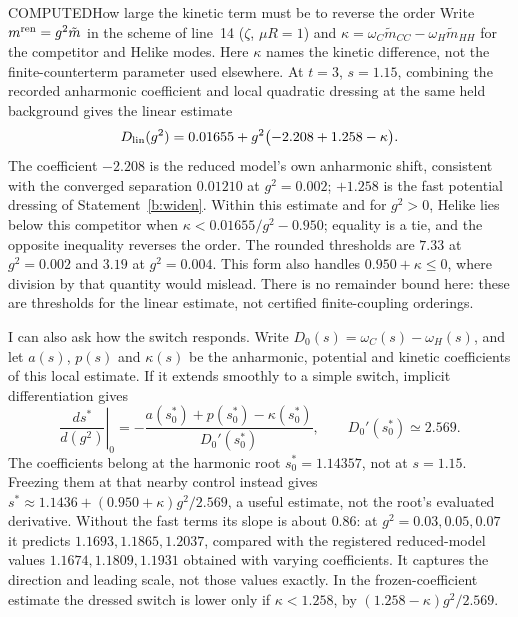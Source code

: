 \begin{claim}{COMPUTED}{How large the kinetic term must be to reverse the order}\label{b:threshold}
Write $m^{\rm ren}=g^2\tilde m$ in the scheme of line~14 ($\zeta$, $\mu R=1$) and
$\kappa=\omega_C\tilde m_{CC}-\omega_H\tilde m_{HH}$ for the competitor and Helike modes. Here $\kappa$ names the
kinetic difference, not the finite-counterterm parameter used elsewhere. At $t=3$, $s=1.15$, combining the recorded
anharmonic coefficient and local quadratic dressing at the same held background gives the linear estimate
\begin{equation}\label{eq:threshold}
 D_{\rm lin}(g^2)=0.01655+g^2\bigl(-2.208+1.258-\kappa\bigr).
\end{equation}
The coefficient $-2.208$ is the reduced model's own anharmonic shift, consistent with the converged separation
$0.01210$ at $g^2=0.002$; $+1.258$ is the fast potential dressing of Statement~\ref{b:widen}.
Within this estimate and for $g^2>0$, Helike lies below this competitor when
$\kappa<0.01655/g^2-0.950$; equality is a tie, and the opposite inequality reverses the order.
The rounded thresholds are $7.33$ at $g^2=0.002$ and $3.19$ at $g^2=0.004$.
This form also handles $0.950+\kappa\le0$, where division by that quantity would mislead.
There is no remainder bound here: these are thresholds for the linear estimate, not certified finite-coupling orderings.

I can also ask how the switch responds. Write $D_0(s)=\omega_C(s)-\omega_H(s)$, and let $a(s)$, $p(s)$ and
$\kappa(s)$ be the anharmonic, potential and kinetic coefficients of this local estimate. If it extends smoothly
to a simple switch, implicit differentiation gives
\begin{equation}\label{eq:dressedswitch}
 \left.\frac{ds^*}{d(g^2)}\right|_{0}
 =-\frac{a(s_0^*)+p(s_0^*)-\kappa(s_0^*)}{D_0'(s_0^*)},\qquad
 D_0'(s_0^*)\simeq2.569 .
\end{equation}
The coefficients belong at the harmonic root $s_0^*=1.14357$, not at $s=1.15$. Freezing them at that nearby control
instead gives $s^*\approx1.1436+(0.950+\kappa)g^2/2.569$, a useful estimate, not the root's evaluated derivative.
Without the fast terms its slope is about $0.86$: at $g^2=0.03,0.05,0.07$ it predicts $1.1693,1.1865,1.2037$,
compared with the registered reduced-model values $1.1674,1.1809,1.1931$ obtained with varying coefficients.
It captures the direction and leading scale, not those values exactly. In the frozen-coefficient estimate the
dressed switch is lower only if $\kappa<1.258$, by $(1.258-\kappa)g^2/2.569$.
\end{claim}

